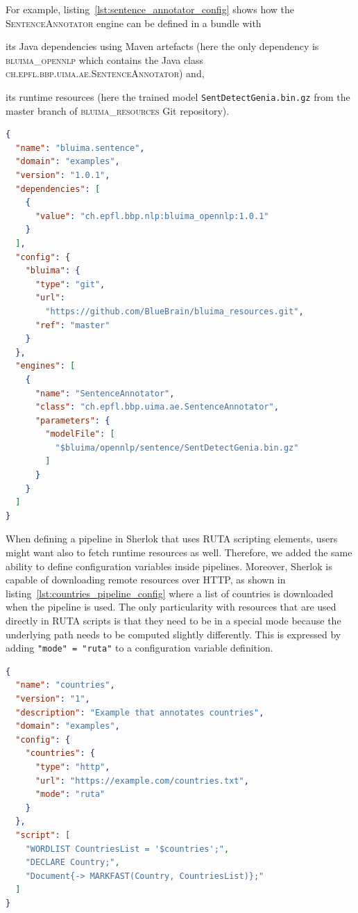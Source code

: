 \documentclass{article}
\newcommand{\ID}[1]{{\textsc{#1}}}
\newcommand{\PATH}[1]{\mbox{\texttt{#1}}}
\begin{document}
For example, listing~\ref{lst:sentence_annotator_config} shows how the \ID{SentenceAnnotator} engine
can be defined in a bundle with
\begin{enumerate*}[label=\itshape\alph*\upshape)]

    \item its Java dependencies using Maven artefacts (here the only dependency is
        \ID{bluima\_opennlp} which contains the Java class
        \ID{ch.epfl.bbp.uima.ae.SentenceAnnotator}) and,

    \item its runtime resources (here the trained model \PATH{SentDetectGenia.bin.gz} from the
        master branch of \ID{bluima\_resources} Git repository).

\end{enumerate*}

\begin{lstlisting}[float,language=json,
                   caption=Configuration of \ID{SentenceAnnotator} in a Sherlok bundle,
                   label=lst:sentence_annotator_config]
{
  "name": "bluima.sentence",
  "domain": "examples",
  "version": "1.0.1",
  "dependencies": [
    {
      "value": "ch.epfl.bbp.nlp:bluima_opennlp:1.0.1"
    }
  ],
  "config": {
    "bluima": {
      "type": "git",
      "url":
        "https://github.com/BlueBrain/bluima_resources.git",
      "ref": "master"
    }
  },
  "engines": [
    {
      "name": "SentenceAnnotator",
      "class": "ch.epfl.bbp.uima.ae.SentenceAnnotator",
      "parameters": {
        "modelFile": [
          "$bluima/opennlp/sentence/SentDetectGenia.bin.gz"
        ]
      }
    }
  ]
}
\end{lstlisting}

When defining a pipeline in Sherlok that uses RUTA scripting elements, users might want also to
fetch runtime resources as well. Therefore, we added the same ability to define configuration
variables inside pipelines. Moreover, Sherlok is capable of downloading remote resources over HTTP,
as shown in listing~\ref{lst:countries_pipeline_config} where a list of countries is downloaded when
the pipeline is used. The only particularity with resources that are used directly in RUTA scripts
is that they need to be in a special mode because the underlying path needs to be computed slightly
differently. This is expressed by adding \verb!"mode" = "ruta"! to a configuration variable
definition.

\begin{lstlisting}[float,language=json,
                   caption=Configuration of the \ID{countries} pipeline,
                   label=lst:countries_pipeline_config]
{
  "name": "countries",
  "version": "1",
  "description": "Example that annotates countries",
  "domain": "examples",
  "config": {
    "countries": {
      "type": "http",
      "url": "https://example.com/countries.txt",
      "mode": "ruta"
    }
  },
  "script": [
    "WORDLIST CountriesList = '$countries';",
    "DECLARE Country;",
    "Document{-> MARKFAST(Country, CountriesList)};"
  ]
}
\end{lstlisting}
\end{document}
